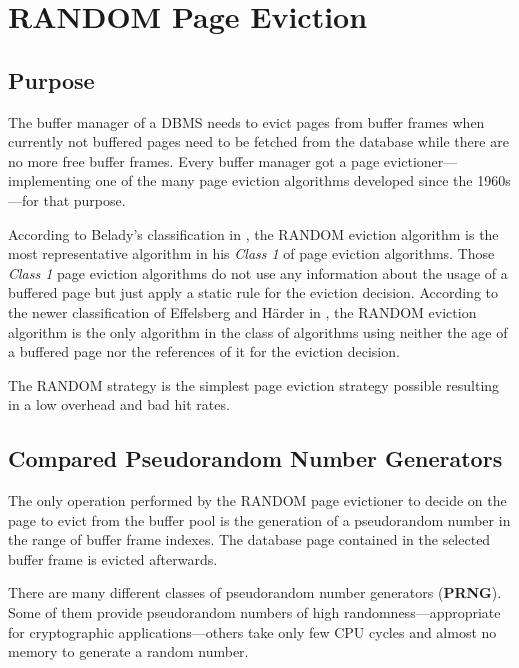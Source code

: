 \chapter[RANDOM Page Eviction]{RANDOM Page Eviction} \label{ch:random}

\section[Purpose]{Purpose}

    The buffer manager of a DBMS needs to evict pages from buffer frames when currently not buffered pages need to be fetched from the database while there are no more free buffer frames. Every buffer manager got a page evictioner---implementing one of the many page eviction algorithms developed since the 1960s---for that purpose.

    According to Belady's classification in \cite{Belady:1966}, the RANDOM eviction algorithm is the most representative algorithm in his \textit{Class 1} of page eviction algorithms. Those \textit{Class 1} page eviction algorithms do not use any information about the usage of a buffered page but just apply a static rule for the eviction decision. According to the newer classification of Effelsberg and Härder in \cite{Effelsberg:1984}, the RANDOM eviction algorithm is the only algorithm in the class of algorithms using neither the age of a buffered page nor the references of it for the eviction decision.

    The RANDOM strategy is the simplest page eviction strategy possible resulting in a low overhead and bad hit rates.

\section[Compared Pseudorandom Number Generators]{Compared Pseudorandom Number Generators}

    The only operation performed by the RANDOM page evictioner to decide on the page to evict from the buffer pool is the generation of a pseudorandom number in the range of buffer frame indexes. The database page contained in the selected buffer frame is evicted afterwards.

    There are many different classes of pseudorandom number generators (\textbf{PRNG}). Some of them provide pseudorandom numbers of high randomness---appropriate for cryptographic applications---others take only few CPU cycles and almost no memory to generate a random number.


